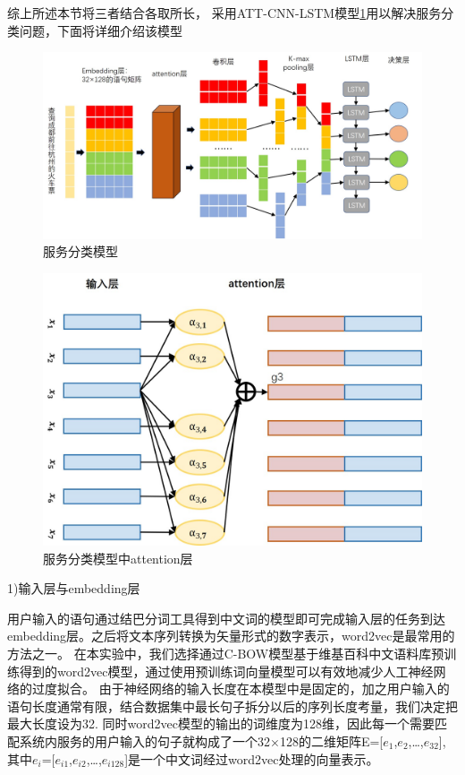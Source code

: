 综上所述本节将三者结合各取所长， 采用ATT-CNN-LSTM模型\ref{fig:cnn-lstm}用以解决服务分类问题，下面将详细介绍该模型

\begin{figure}[htbp]
    \centering
    \includegraphics[scale=0.5]{./images/cnn-lstm.jpg}
    \caption{服务分类模型}
    \label{fig:cnn-lstm}
  \end{figure}


  \begin{figure}[htbp]
    \centering
    \includegraphics[scale=0.5]{./images/attcnn.jpg}
    \caption{服务分类模型中attention层}
    \label{fig:att-cnn}
  \end{figure}


  1)输入层与embedding层

  用户输入的语句通过结巴分词工具得到中文词的模型即可完成输入层的任务到达embedding层。之后将文本序列转换为矢量形式的数字表示，word2vec是最常用的方法之一。
  在本实验中，我们选择通过C-BOW模型基于维基百科中文语料库预训练得到的word2vec模型，通过使用预训练词向量模型可以有效地减少人工神经网络的过度拟合。
  由于神经网络的输入长度在本模型中是固定的，加之用户输入的语句长度通常有限，结合数据集中最长句子拆分以后的序列长度考量，我们决定把最大长度设为32.
  同时word2vec模型的输出的词维度为128维，因此每一个需要匹配系统内服务的用户输入的句子就构成了一个32×128的二维矩阵E=[$e_{1}$,$e_{2}$,\dots,$e_{32}$],
  其中$e_{i}$=[$e_{i1}$,$e_{i2}$,\dots,$e_{i128}$]是一个中文词经过word2vec处理的向量表示。

